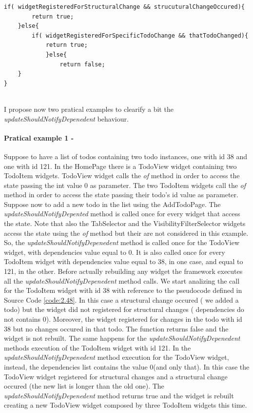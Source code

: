 \begin{code}
\mbox{}
\label{code:2.48}
\begin{verbatim}
if( widgetRegisteredForStructuralChange && strucuturalChangeOccured){
        return true;
    }else{
        if( widgetRegisteredForSpecificTodoChange && thatTodoChanged){
            return true;
            }else{
                return false;
    }
}
\end{verbatim}
\end{code}
\mbox{}\\
I propose now two pratical examples to clearify a bit the  \textit{updateShouldNotifyDepenedent} behaviour.
\paragraph{Pratical example 1 - } 
\label{subpar:todo_updating_feature_inherited_wdiget}
Suppose to have a list of todos containing two todo instances, one with id 38 and one with id 121. In the HomePage there is a TodoView widget containing two TodoItem widgets. TodoView widget calls the \textit{of} method in order to access the state passing the int value 0 as parameter. The two TodoItem widgets call the \textit{of} method in order to access the state passing their todo's id value as parameter. Suppose now to add a new todo in the list using the AddTodoPage. The \textit{updateShouldNotifyDepented} method is called once for every widget that access the state. Note that also the TabSelector and the VisibilityFilterSelector widgets access the state using the \textit{of} method but their are not considered in this example. So, the \textit{updateShouldNotifyDepenedent} method is called once for the TodoView widget, with dependencies value equal to 0. It is also called once for every TodoItem widget with dependencies value equal to 38, in one case, and equal to 121, in the other. Before actually rebuilding any widget the framework executes all the \textit{updateShouldNotifyDepenedent} method calls. We start analizing the call for the TodoItem widget with id 38 with reference to the pseudocode defined in Source Code \ref{code:2.48}. In this case a structural change occured ( we added a todo)  but the widget did not registered for structural changes ( dependencies do not contains 0). Moreover, the widget registered for changes in the todo with id 38 but no changes occured in that todo. The function returns false and the widget is not rebuilt. The same happens for the \textit{updateShouldNotifyDepenedent} methods execution of the TodoItem widget with id 121. In the \textit{updateShouldNotifyDepenedent} method execution for the TodoView widget, instead, the dependencies list contains the value 0(and only that). In this case the TodoView widget registered for structural changes and a structural change occured (the new list is longer than the old one). The \textit{updateShouldNotifyDepenedent} method returns true and the widget is rebuilt creating a new TodoView widget composed by three TodoItem widgets this time.
